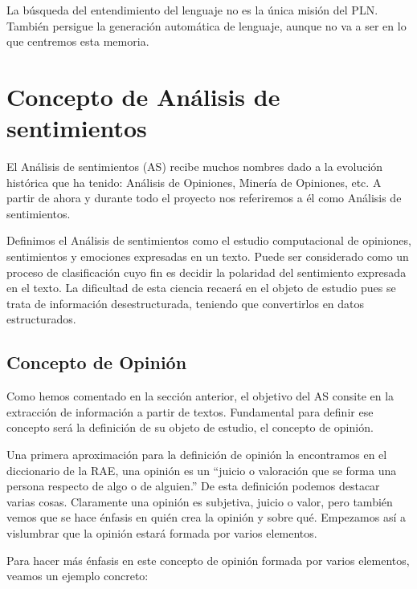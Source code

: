 	La búsqueda del entendimiento del lenguaje no es la única misión del PLN. También persigue la generación automática de lenguaje, aunque no va a ser en lo que centremos esta memoria.
	
	
	
\section{Concepto de Análisis de sentimientos}\label{conceptoSA}

	El Análisis de sentimientos (AS) recibe muchos nombres dado a la evolución histórica que ha tenido: Análisis de Opiniones, Minería de Opiniones, etc. A partir de ahora y durante todo el proyecto nos referiremos a él como Análisis de sentimientos.
	
	Definimos el Análisis de sentimientos como el estudio computacional de opiniones, sentimientos y emociones expresadas en un texto. Puede ser considerado como un proceso de clasificación cuyo fin es decidir la polaridad del sentimiento expresada en el texto. La dificultad de esta ciencia recaerá en el objeto de estudio pues se trata de información desestructurada, teniendo que convertirlos en datos estructurados. 
	
	\subsection{Concepto de Opinión}\label{opinion}
	
		Como hemos comentado en la sección anterior, el objetivo del AS consite en la extracción de información a partir de textos. Fundamental para definir ese concepto será la definición de su objeto de estudio, el concepto de opinión.
		
		Una primera aproximación para la definición de opinión la encontramos en el diccionario de la RAE, una opinión es un ``juicio o valoración que se forma una persona respecto de algo o de alguien.'' De esta definición podemos destacar varias cosas. Claramente una opinión es subjetiva, juicio o valor, pero también vemos que se hace énfasis en  quién crea la opinión y sobre qué. Empezamos así a vislumbrar que la opinión estará formada por varios elementos. 
		
		Para hacer más énfasis en este concepto de opinión formada por varios elementos, veamos un ejemplo concreto:
		
